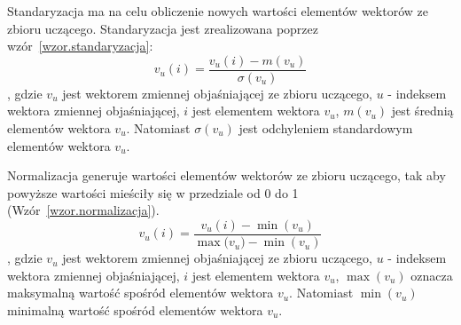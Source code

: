 \documentclass[a4paper,twoside,12pt]{book}
\begin{document}
    Standaryzacja ma na celu obliczenie nowych wartości elementów wektorów ze zbioru uczącego.
    Standaryzacja jest zrealizowana poprzez wzór~\ref{wzor.standaryzacja}:
    \large
    \begin{equation}
    {v}
        _{u}(i) = \frac{{v}_{u}(i)-m({v}_{u})}{\sigma({v}_{u})}
        \label{wzor.standaryzacja}
    \end{equation}
    \normalsize
    , gdzie ${v}_{u}$ jest wektorem zmiennej objaśniającej ze zbioru uczącego, $u$ - indeksem wektora zmiennej
    objaśniającej, $i$ jest elementem wektora ${v}_{u}$, $m({v}_{u})$ jest średnią elementów wektora
    ${v}_{u}$. Natomiast $\sigma({v}_{u})$ jest odchyleniem standardowym elementów wektora ${v}_{u}$.

    Normalizacja generuje wartości elementów wektorów ze zbioru uczącego, tak aby powyższe wartości mieściły się w przedziale
    od 0 do 1 (Wzór~\ref{wzor.normalizacja}).
    \large
    \begin{equation}
    {v}
        _{u}(i) = \frac{{v}_{u}(i)-\min({{v}_{u}})}{\max({{v}_{u})}-\min({{v}_{u}})}
        \label{wzor.normalizacja}
    \end{equation}
    \normalsize
    , gdzie ${v}_{u}$ jest wektorem zmiennej objaśniającej ze zbioru uczącego, $u$ - indeksem wektora zmiennej
    objaśniającej, $i$ jest elementem wektora ${v}_{u}$, $\max({v}_{u})$ oznacza maksymalną wartość spośród elementów
    wektora ${v}_{u}$. Natomiast $\min({v}_{u})$ minimalną wartość spośród elementów
    wektora ${v}_{u}$.
\end{document}
